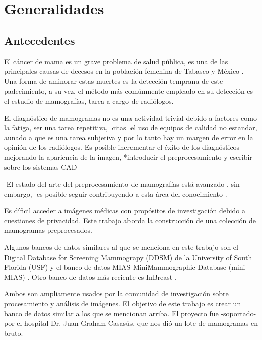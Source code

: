 \chapter{Generalidades}

 \setcounter{page}{1}

\section{Antecedentes}

El cáncer de mama es un grave problema de salud pública, es una de las
principales causas de decesos en la población femenina de Tabasco y México
\cite{inegi, mxcancer}. Una forma de aminorar estas muertes es la detección
temprana de este padecimiento, a su vez, el método más comúnmente empleado en
su detección es el estudio de mamografías, tarea a cargo de radiólogos.

El diagnóstico de mamogramas no es una actividad trivial debido a factores como
la fatiga, ser una tarea repetitiva, [citas] el uso de equipos de calidad no
estandar, aunado a que es una tarea subjetiva y por lo tanto hay un margen de
error en la opinión de los radiólogos. Es posible incrementar el éxito de los
diagnósticos mejorando la apariencia de la imagen, *introducir el
preprocesamiento y escribir sobre los sistemas CAD-


-El estado del arte del preprocesamiento de mamografías está avanzado-, sin embargo,
-es posible seguir contribuyendo a esta área del conocimiento-. 

Es díficil acceder a imágenes médicas con propósitos de investigación debido a
cuestiones de privacidad. Este trabajo aborda la construcción de una colección
de mamogramas preprocesados.

Algunos bancos de datos similares al que se menciona en este trabajo son el Digital
Database for Screening Mammograpy (DDSM) de la University of South Florida
(USF) \cite{heath2000digital} y el banco de datos MIAS MiniMammographic
Database (mini-MIAS) \cite{sucklingmini}. Otro banco de datos más reciente es
InBreast \cite{moreira2012inbreast}.

Ambos son ampliamente usados por la comunidad de investigación sobre
procesamiento y análisis de imágenes. El objetivo de este trabajo es crear un
banco de datos similar a los que se mencionan arriba. El proyecto fue
-soportado- por el hospital Dr. Juan Graham Casasús, que nos dió un lote de
mamogramas en bruto.

